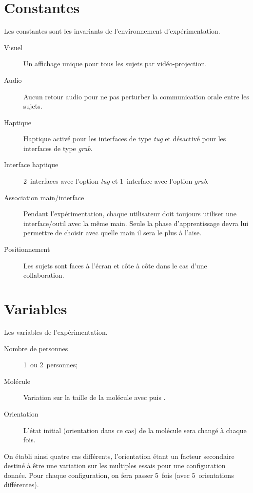 \documentclass[a4paper,fleqn]{report}
\newcommand{\PHANToM}{\Nom{PHANToM}\xspace}
\newcommand{\Omni}{\Nom{\PHANToM Omni}\xspace}
\begin{document}
		\section{Constantes}
			Les constantes sont les invariants de l'environnement d'expérimentation.
			\begin{description}
				\item[Visuel] Un affichage unique pour tous les sujets par vidéo-projection.
				\item[Audio] Aucun retour audio pour ne pas perturber la communication orale entre les sujets.
				\item[Haptique] Haptique activé pour les interfaces de type \emph{tug} et désactivé pour les interfaces de type \emph{grab}.
				\item[Interface haptique] 2~interfaces \Omni avec l'option \emph{tug} et 1~interface \Omni avec l'option \emph{grab}.
				\item[Association main/interface] Pendant l'expérimentation, chaque utilisateur doit toujours utiliser une interface/outil avec la même main.
				Seule la phase d'apprentissage devra lui permettre de choisir avec quelle main il sera le plus à l'aise.
				\item[Positionnement] Les sujets sont faces à l'écran et côte à côte dans le cas d'une collaboration.
			\end{description}

		\section{Variables}
			Les variables de l'expérimentation.
			\begin{description}
				\item[Nombre de personnes] 1~ou 2~personnes;
				\item[Molécule] Variation sur la taille de la molécule avec  puis .
				\item[Orientation] L'état initial (orientation dans ce cas) de la molécule sera changé à chaque fois.
			\end{description}
			On établi ainsi quatre cas différents, l'orientation étant un facteur secondaire destiné à être une variation sur les multiples essais pour une configuration donnée.
			Pour chaque configuration, on fera passer 5~fois (avec 5~orientations différentes).
\end{document}
